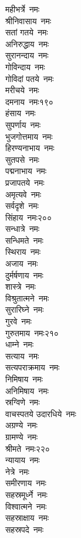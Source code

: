 \begin{multicols}{\maxColumns}
\begin{flushleft}
महीभर्त्रे~नमः\\
श्रीनिवासाय~नमः\\
सतां गतये~नमः\\
अनिरुद्धाय~नमः\\
सुरानन्दाय~नमः\\
गोविन्दाय~नमः\\
गोविदां पतये~नमः\\
मरीचये~नमः\\
दमनाय~नमः\hfill १९०\\
हंसाय~नमः\\
सुपर्णाय~नमः\\
भुजगोत्तमाय~नमः\\
हिरण्यनाभाय~नमः\\
सुतपसे~नमः\\
पद्मनाभाय~नमः\\
प्रजापतये~नमः\\
अमृत्यवे~नमः\\
सर्वदृशे~नमः\\
सिंहाय~नमः\hfill २००\\
सन्धात्रे~नमः\\
सन्धिमते~नमः\\
स्थिराय~नमः\\
अजाय~नमः\\
दुर्मर्षणाय~नमः\\
शास्त्रे~नमः\\
विश्रुतात्मने~नमः\\
सुरारिघ्ने~नमः\\
गुरवे~नमः\\
गुरुतमाय~नमः\hfill २१०\\
धाम्ने~नमः\\
सत्याय~नमः\\
सत्यपराक्रमाय~नमः\\
निमिषाय~नमः\\
अनिमिषाय~नमः\\
स्रग्विणे~नमः\\
वाचस्पतये उदारधिये~नमः\\
अग्रण्ये~नमः\\
ग्रामण्ये~नमः\\
श्रीमते~नमः\hfill २२०\\
न्यायाय~नमः\\
नेत्रे~नमः\\
समीरणाय~नमः\\
सहस्रमूर्ध्ने~नमः\\
विश्वात्मने~नमः\\
सहस्राक्षाय~नमः\\
सहस्रपदे~नमः\\

\end{flushleft}
\end{multicols}
